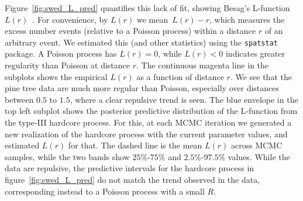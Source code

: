 \documentclass{statsoc}
\begin{document}
  Figure~\ref{fig:swed_L_pred} quantifies this lack of fit, %
  showing Besag's L-function $L(r)$~\citep{Besag77}.
  For convenience, by $L(r)$ we mean~${L(r) - r}$, which measures the excess number events (relative to a Poisson process) within 
  a distance $r$ of an arbitrary event. We estimated this (and other statistics) using the \texttt{spatstat} package. 
  A Poisson process has ${L(r) = 0}$, while
  ${L(r) < 0}$ indicates greater regularity than Poisson at distance $r$. 
The continuous magenta line in the subplots shows the empirical $L(r)$ as a function of distance $r$.
  We see that the pine tree data are much more regular than Poisson, especially over distances between $0.5$ to $1.5$, where a clear repulsive trend is seen.
  The blue envelope in the top left subplot shows the posterior predictive distribution of the L-function 
  from the type-III hardcore process. For this, at each MCMC iteration we generated a new realization of the hardcore process with the 
  current parameter values, and estimated $L(r)$ for that. The dashed line is the mean $L(r)$ across MCMC samples, while the two bands show $25\%$-$75\%$ and
  $2.5\%$-$97.5\%$ values. %
  While the data are repulsive, the predictive intervals for the hardcore process in figure~\ref{fig:swed_L_pred} do not match the trend observed in the data, 
  corresponding instead to a Poisson process with a small $R$. %
\end{document}
